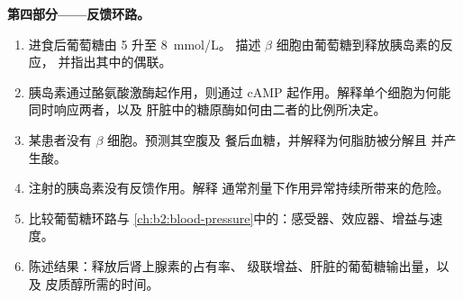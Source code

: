 \begin{problem}
\medskip
\noindent\textbf{第四部分——反馈环路。}
\begin{enumerate}[resume]
  \item 进食后葡萄糖由 5 升至 \qty{8}{mmol/L}。
        描述 $\beta$ 细胞由葡萄糖到释放胰岛素的反应，
        并指出其中的偶联。
  \item 胰岛素通过酪氨酸激酶起作用，则通过
        cAMP 起作用。解释单个细胞为何能同时响应两者，以及
        肝脏中的糖原酶如何由二者的比例所决定。
  \item 某患者没有 $\beta$ 细胞。预测其空腹及
        餐后血糖，并解释为何脂肪被分解且
        并产生酸。
  \item 注射的胰岛素没有反馈作用。解释
        通常剂量下作用异常持续所带来的危险。
  \item 比较葡萄糖环路与
        \cref{ch:b2:blood-pressure}中的：感受器、效应器、增益与速度。
  \item 陈述结果：释放后肾上腺素的占有率、
        级联增益、肝脏的葡萄糖输出量，以及
        皮质醇所需的时间。
\end{enumerate}
\end{problem}
